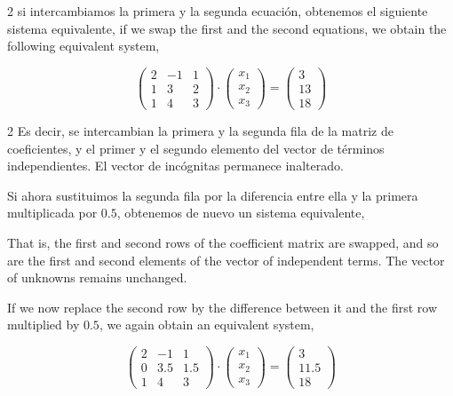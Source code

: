 \begin{paracol}{2}
si intercambiamos la primera y la segunda ecuación, obtenemos el siguiente sistema equivalente,
\switchcolumn
if we swap the first and the second equations, we obtain the following equivalent system,
\end{paracol}

\begin{equation*}
\begin{pmatrix}
2& -1& 1\\
1& 3& 2\\
1& 4& 3
\end{pmatrix}\cdot \begin{pmatrix}
x_1\\
x_2\\
x_3
\end{pmatrix}=\begin{pmatrix}
3\\
13\\
18
\end{pmatrix}
\end{equation*}

\begin{paracol}{2}
Es decir, se intercambian la primera y la segunda fila de la matriz de coeficientes, y el primer y el segundo elemento del vector de términos independientes. El vector de incógnitas permanece inalterado.

Si ahora sustituimos la segunda fila por la diferencia entre ella y la primera multiplicada por $0.5$, obtenemos de nuevo un sistema equivalente,

\switchcolumn
That is, the first and second rows of the coefficient matrix are swapped, and so are the first and second elements of the vector of independent terms. The vector of unknowns remains unchanged.

If we now replace the second row by the difference between it and the first row multiplied by $0.5$, we again obtain an equivalent system,
\end{paracol}

\begin{equation*}
\begin{pmatrix}
2& -1& 1\\
0& 3.5& 1.5\\
1& 4& 3
\end{pmatrix}\cdot \begin{pmatrix}
x_1\\
x_2\\
x_3
\end{pmatrix}=\begin{pmatrix}
3\\
11.5\\
18
\end{pmatrix}
\end{equation*}

